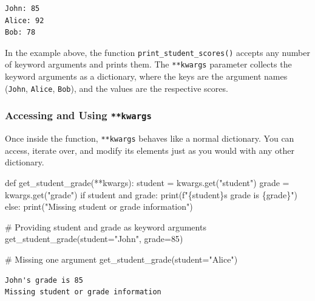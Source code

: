 \documentclass[
  letterpaper,
  DIV=11,
  numbers=noendperiod]{scrreprt}
\newenvironment{Shaded}{\begin{snugshade}}{\end{snugshade}}
\newcommand{\BuiltInTok}[1]{\textcolor[rgb]{0.00,0.23,0.31}{#1}}
\newcommand{\CommentTok}[1]{\textcolor[rgb]{0.37,0.37,0.37}{#1}}
\newcommand{\ControlFlowTok}[1]{\textcolor[rgb]{0.00,0.23,0.31}{#1}}
\newcommand{\DecValTok}[1]{\textcolor[rgb]{0.68,0.00,0.00}{#1}}
\newcommand{\KeywordTok}[1]{\textcolor[rgb]{0.00,0.23,0.31}{#1}}
\newcommand{\NormalTok}[1]{\textcolor[rgb]{0.00,0.23,0.31}{#1}}
\newcommand{\OperatorTok}[1]{\textcolor[rgb]{0.37,0.37,0.37}{#1}}
\newcommand{\SpecialCharTok}[1]{\textcolor[rgb]{0.37,0.37,0.37}{#1}}
\newcommand{\SpecialStringTok}[1]{\textcolor[rgb]{0.13,0.47,0.30}{#1}}
\newcommand{\StringTok}[1]{\textcolor[rgb]{0.13,0.47,0.30}{#1}}
\begin{document}
\begin{verbatim}
John: 85
Alice: 92
Bob: 78
\end{verbatim}

In the example above, the function \texttt{print\_student\_scores()}
accepts any number of keyword arguments and prints them. The
\texttt{**kwargs} parameter collects the keyword arguments as a
dictionary, where the keys are the argument names (\texttt{John},
\texttt{Alice}, \texttt{Bob}), and the values are the respective scores.

\hypertarget{accessing-and-using-kwargs}{%
\subsubsection{\texorpdfstring{Accessing and Using
\texttt{**kwargs}}{Accessing and Using **kwargs}}\label{accessing-and-using-kwargs}}

Once inside the function, \texttt{**kwargs} behaves like a normal
dictionary. You can access, iterate over, and modify its elements just
as you would with any other dictionary.

\begin{Shaded}
\begin{Highlighting}[]
\KeywordTok{def}\NormalTok{ get\_student\_grade(}\OperatorTok{**}\NormalTok{kwargs):}
\NormalTok{    student }\OperatorTok{=}\NormalTok{ kwargs.get(}\StringTok{"student"}\NormalTok{)}
\NormalTok{    grade }\OperatorTok{=}\NormalTok{ kwargs.get(}\StringTok{"grade"}\NormalTok{)}
    \ControlFlowTok{if}\NormalTok{ student }\KeywordTok{and}\NormalTok{ grade:}
        \BuiltInTok{print}\NormalTok{(}\SpecialStringTok{f"}\SpecialCharTok{\{}\NormalTok{student}\SpecialCharTok{\}}\SpecialStringTok{\textquotesingle{}s grade is }\SpecialCharTok{\{}\NormalTok{grade}\SpecialCharTok{\}}\SpecialStringTok{"}\NormalTok{)}
    \ControlFlowTok{else}\NormalTok{:}
        \BuiltInTok{print}\NormalTok{(}\StringTok{"Missing student or grade information"}\NormalTok{)}

\CommentTok{\# Providing student and grade as keyword arguments}
\NormalTok{get\_student\_grade(student}\OperatorTok{=}\StringTok{"John"}\NormalTok{, grade}\OperatorTok{=}\DecValTok{85}\NormalTok{)}

\CommentTok{\# Missing one argument}
\NormalTok{get\_student\_grade(student}\OperatorTok{=}\StringTok{"Alice"}\NormalTok{)  }
\end{Highlighting}
\end{Shaded}

\begin{verbatim}
John's grade is 85
Missing student or grade information
\end{verbatim}
\end{document}
